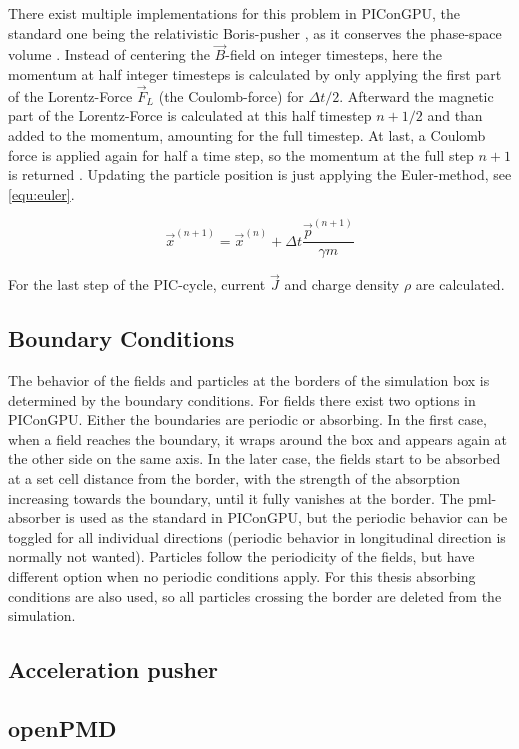 \documentclass[bachelor_thesis]{subfiles}
\begin{document}
There exist multiple implementations for this problem in PIConGPU, the standard one being the relativistic Boris-pusher \cite{Boris1970}, as it conserves the phase-space volume \cite{PICRepo}. Instead of centering the $\vec{B}$-field on integer timesteps, here the momentum at half integer timesteps is
calculated by only applying the first part of the Lorentz-Force $\vec{F}_L$ (the Coulomb-force) for $\Delta t/2$. Afterward the magnetic part of the Lorentz-Force is calculated at this half timestep $n+1/2$ and than added to the momentum, amounting for the full timestep.
At last, a Coulomb force is applied again for half a time step, so the momentum at the full step $n+1$ is returned \cite{Zenitani2018, Pausch2019}. Updating the particle position is just applying the Euler-method, see \autoref{equ:euler}.

\begin{equation}
	\vec{x}^{(n+1)} = \vec{x}^{(n)} + \Delta t \frac{\vec{p}^{(n+1)}}{\gamma m}
	\label{equ:euler}
\end{equation}

For the last step of the PIC-cycle, current $\vec{J}$ and charge density $\rho$ are calculated. 

\subsection{Boundary Conditions}
The behavior of the fields and particles at the borders of the simulation box is determined by the boundary conditions.
For fields there exist two options in PIConGPU. Either the boundaries are periodic or absorbing. In the first case, when a field reaches the boundary, it wraps around the box and appears again at the other side on the same axis.
In the later case, the fields start to be absorbed at a set cell distance from the border, with the strength of the absorption increasing towards the boundary, until it fully vanishes at the border.
The \gls{pml}-absorber is used as the standard in PIConGPU, but the periodic behavior can be toggled for all individual directions (periodic behavior in longitudinal direction is normally not wanted).
Particles follow the periodicity of the fields, but have different option when no periodic conditions apply. For this thesis absorbing conditions are also used, so all particles crossing the border are deleted from the simulation.

\subsection{Acceleration pusher}


\subsection{openPMD}
\end{document}
